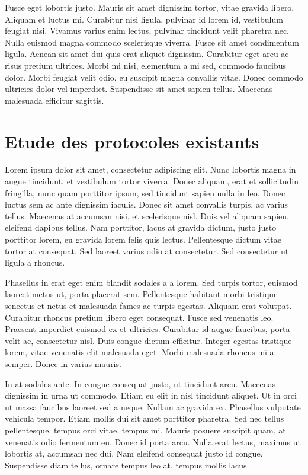 \documentclass[a4paper,12pt]{report}
\begin{document}
Fusce eget lobortis justo. Mauris sit amet dignissim tortor, vitae gravida libero. Aliquam et luctus mi. Curabitur nisi ligula, pulvinar id lorem id, vestibulum feugiat nisi. Vivamus varius enim lectus, pulvinar tincidunt velit pharetra nec. Nulla euismod magna commodo scelerisque viverra. Fusce sit amet condimentum ligula. Aenean sit amet dui quis erat aliquet dignissim. Curabitur eget arcu ac risus pretium ultrices. Morbi mi nisi, elementum a mi sed, commodo faucibus dolor. Morbi feugiat velit odio, eu suscipit magna convallis vitae. Donec commodo ultricies dolor vel imperdiet. Suspendisse sit amet sapien tellus. Maecenas malesuada efficitur sagittis.

\section{Etude des protocoles existants}%
Lorem ipsum dolor sit amet, consectetur adipiscing elit. Nunc lobortis magna in augue tincidunt, et vestibulum tortor viverra. Donec aliquam, erat et sollicitudin fringilla, nunc quam porttitor ipsum, sed tincidunt sapien nulla in leo. Donec luctus sem ac ante dignissim iaculis. Donec sit amet convallis turpis, ac varius tellus. Maecenas at accumsan nisi, et scelerisque nisl. Duis vel aliquam sapien, eleifend dapibus tellus. Nam porttitor, lacus at gravida dictum, justo justo porttitor lorem, eu gravida lorem felis quis lectus. Pellentesque dictum vitae tortor at consequat. Sed laoreet varius odio at consectetur. Sed consectetur ut ligula a rhoncus.

Phasellus in erat eget enim blandit sodales a a lorem. Sed turpis tortor, euismod laoreet metus ut, porta placerat sem. Pellentesque habitant morbi tristique senectus et netus et malesuada fames ac turpis egestas. Aliquam erat volutpat. Curabitur rhoncus pretium libero eget consequat. Fusce sed venenatis leo. Praesent imperdiet euismod ex et ultricies. Curabitur id augue faucibus, porta velit ac, consectetur nisl. Duis congue dictum efficitur. Integer egestas tristique lorem, vitae venenatis elit malesuada eget. Morbi malesuada rhoncus mi a semper. Donec in varius mauris.

In at sodales ante. In congue consequat justo, ut tincidunt arcu. Maecenas dignissim in urna ut commodo. Etiam eu elit in nisl tincidunt aliquet. Ut in orci ut massa faucibus laoreet sed a neque. Nullam ac gravida ex. Phasellus vulputate vehicula tempor. Etiam mollis dui sit amet porttitor pharetra. Sed nec tellus pellentesque, tempus orci vitae, tempus mi. Mauris posuere suscipit quam, at venenatis odio fermentum eu. Donec id porta arcu. Nulla erat lectus, maximus ut lobortis at, accumsan nec dui. Nam eleifend consequat justo id congue. Suspendisse diam tellus, ornare tempus leo at, tempus mollis lacus.
\end{document}
